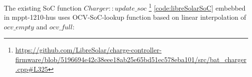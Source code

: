 %
%
%    
% 



\pagebreak

The existing SoC function $Charger::update\_soc$  \footnote{\url{https://github.com/LibreSolar/charge-controller-firmware/blob/5196694e42c38eee18ab25e65bd51ec578eba101/src/bat_charger.cpp\#L325}} \ref{code:libreSolarSoC} embebbed in mppt-1210-hus uses OCV-SoC-lookup function based on linear interpolation of 
$ocv\_empty$ and $ocv\_full$:

